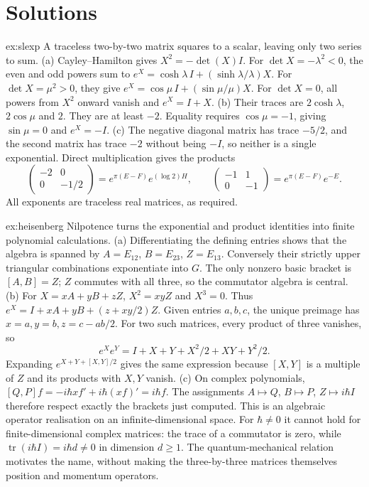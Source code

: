 \section{Solutions}

\begin{solution}{ex:slexp}
\idea A traceless two-by-two matrix squares to a scalar, leaving only two
series to sum.
\writeup (a) Cayley--Hamilton gives $X^2=-\det(X)I$.
For $\det X=-\lambda^2<0$, the even and odd powers sum to
$e^X=\cosh\lambda\,I+(\sinh\lambda/\lambda)X$.
For $\det X=\mu^2>0$, they give
$e^X=\cos\mu\,I+(\sin\mu/\mu)X$.
For $\det X=0$, all powers from $X^2$ onward vanish and $e^X=I+X$.
(b) Their traces are $2\cosh\lambda$, $2\cos\mu$ and $2$.
They are at least $-2$. Equality requires $\cos\mu=-1$, giving
$\sin\mu=0$ and $e^X=-I$.
(c) The negative diagonal matrix has trace $-5/2$, and the second
matrix has trace $-2$ without being $-I$, so neither is a single
exponential. Direct multiplication gives the products
\[
 \begin{pmatrix}-2&0\\0&-1/2\end{pmatrix}
 =e^{\pi(E-F)}e^{(\log2)H},\qquad
 \begin{pmatrix}-1&1\\0&-1\end{pmatrix}
 =e^{\pi(E-F)}e^{-E}.
\]
All exponents are traceless real matrices, as required.
\end{solution}
\begin{solution}{ex:heisenberg}
\idea Nilpotence turns the exponential and product identities into finite
polynomial calculations.
\writeup (a) Differentiating the defining entries shows that the algebra
is spanned by $A=E_{12}$, $B=E_{23}$, $Z=E_{13}$.
Conversely their strictly upper triangular combinations exponentiate
into $G$. The only nonzero basic bracket is $[A,B]=Z$;
$Z$ commutes with all three, so the commutator algebra is central.
(b) For $X=xA+yB+zZ$, $X^2=xyZ$ and $X^3=0$.
Thus $e^X=I+xA+yB+(z+xy/2)Z$.
Given entries $a,b,c$, the unique preimage has
$x=a,y=b,z=c-ab/2$.
For two such matrices, every product of three vanishes, so
\[
 e^Xe^Y=I+X+Y+X^2/2+XY+Y^2/2.
\]
Expanding $e^{X+Y+[X,Y]/2}$ gives the same expression because
$[X,Y]$ is a multiple of $Z$ and its products with $X,Y$ vanish.
(c) On complex polynomials,
$[Q,P]f=-i\hbar xf'+i\hbar(xf)'=i\hbar f$.
The assignments $A\mapsto Q$, $B\mapsto P$, $Z\mapsto i\hbar I$
therefore respect exactly the brackets just computed.
This is an algebraic operator realisation on an infinite-dimensional
space. For $\hbar\ne0$ it cannot hold for finite-dimensional complex
matrices: the trace of a commutator is zero, while
$\operatorname{tr}(i\hbar I)=i\hbar d\ne0$ in dimension $d\ge1$.
The quantum-mechanical relation motivates the name, without making the
three-by-three matrices themselves position and momentum operators.
\end{solution}

